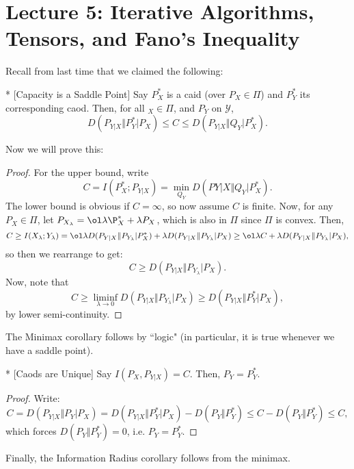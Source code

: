 \section*{Lecture 5: Iterative Algorithms, Tensors, and Fano's Inequality}
\setcounter{section}{5}
\setcounter{subsection}{0}
\setcounter{defn}{0}
\setcounter{defncontainer}{0}

Recall from last time that we claimed the following:

\begin{thm}*
	[Capacity is a Saddle Point]
	Say $P_X^*$ is a caid (over $P_X\in \Pi$) and $P_Y^*$ its corresponding caod. 
	Then, for all $_X\in \Pi$, and $P_Y$ on $\mathcal Y$, \[
		D(P_{Y|X} \Vert P_Y^*|P_X) \leq C \leq D(P_{Y|X} \Vert Q_Y|P_X^*).
	\]
\end{thm}

Now we will prove this:

\begin{proof}
	For the upper bound, write \[
		C = I(P_X^*; P_{Y|X}) = \min_{Q_Y} D(P{Y|X} \Vert Q_Y|P_X^*).
	\]
	The lower bound is obvious if $C = \infty$, so now assume $C$ is finite.
	Now, for any $P_X\in \Pi$, let $P_{X_\lambda} = \ol \lambda \P_X^* + \lambda P_X$, which is also in $\Pi$ since $\Pi$ is convex. Then, \[
		C\geq I(X_\lambda; Y_\lambda) = \ol \lambda D(P_{Y|X} \Vert P_{Y_\lambda} |P _X^*) + \lambda D(P_{Y|X} \Vert P_{Y_\lambda} | P_X) \geq \ol \lambda C + \lambda D(P_{Y|X} \Vert P_{Y_\lambda} | P_X),
	\]so then we rearrange to get: \[
		C \geq D(P_{Y|X} \Vert P_{Y_\lambda} | P_X).
	\]
	Now, note that \[
		C \geq \liminf_{\lambda \to 0} D(P_{Y|X}\Vert P_{Y_\lambda} | P_X) \geq D(P_{Y|X} \Vert P_Y^*|P_X),
	\]by lower semi-continuity.
\end{proof}

The Minimax corollary follows by ``logic" (in particular, it is true whenever we have a saddle point).

\begin{cor}*
	[Caods are Unique]
	Say $I(P_X,P_{Y|X}) = C$. Then, $P_Y = P_Y^*$.
\end{cor}

\begin{proof}
	Write: \[
		C = D(P_{Y|X} \Vert P_Y | P_X) = D(P_{Y|X} \Vert P_Y^* | P_X) - D(P_Y \Vert P_Y^*) \leq C - D(P_Y\Vert P_Y^*) \leq C,
	\]
	which forces $D(P_Y \Vert P_Y^*) = 0$, i.e. $P_Y = P_Y^*$.
\end{proof}

Finally, the Information Radius corollary follows from the minimax.

